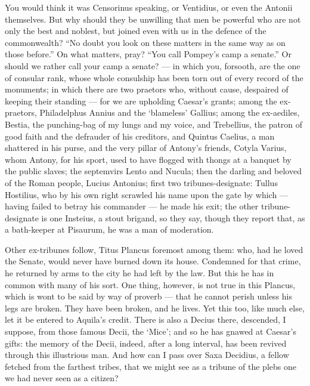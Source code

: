  You would think it was Censorinus speaking, or Ventidius, or even the Antonii themselves. But why should they be unwilling that men be powerful who are not only the best and noblest, but joined even with us in the defence of the commonwealth? ``No doubt you look on these matters in the same way as on those before.'' On what matters, pray? ``You call Pompey's camp a senate.'' Or should we rather call your camp a senate? --- in which you, forsooth, are the one of consular rank, whose whole consulship has been torn out of every record of the monuments; in which there are two praetors who, without cause, despaired of keeping their standing --- for we are upholding Caesar's grants; among the ex-praetors, Philadelphus Annius and the `blameless' Gallius; among the ex-aediles, Bestia, the punching-bag of my lungs and my voice, and Trebellius, the patron of good faith and the defrauder of his creditors, and Quintus Caelius, a man shattered in his purse, and the very pillar of Antony's friends, Cotyla Varius, whom Antony, for his sport, used to have flogged with thongs at a banquet by the public slaves; the septemvirs Lento and Nucula; then the darling and beloved of the Roman people, Lucius Antonius; first two tribunes-designate: Tullus Hostilius, who by his own right scrawled his name upon the gate by which --- having failed to betray his commander --- he made his exit; the other tribune-designate is one Insteius, a stout brigand, so they say, though they report that, as a bath-keeper at Pisaurum, he was a man of moderation.

 Other ex-tribunes follow, Titus Plancus foremost among them: who, had he loved the Senate, would never have burned down its house. Condemned for that crime, he returned by arms to the city he had left by the law. But this he has in common with many of his sort. One thing, however, is not true in this Plancus, which is wont to be said by way of proverb --- that he cannot perish unless his legs are broken. They have been broken, and he lives. Yet this too, like much else, let it be entered to Aquila's credit. There is also a Decius there, descended, I suppose, from those famous Decii, the `Mice'; and so he has gnawed at Caesar's gifts: the memory of the Decii, indeed, after a long interval, has been revived through this illustrious man. And how can I pass over Saxa Decidius, a fellow fetched from the farthest tribes, that we might see as a tribune of the plebs one we had never seen as a citizen?

